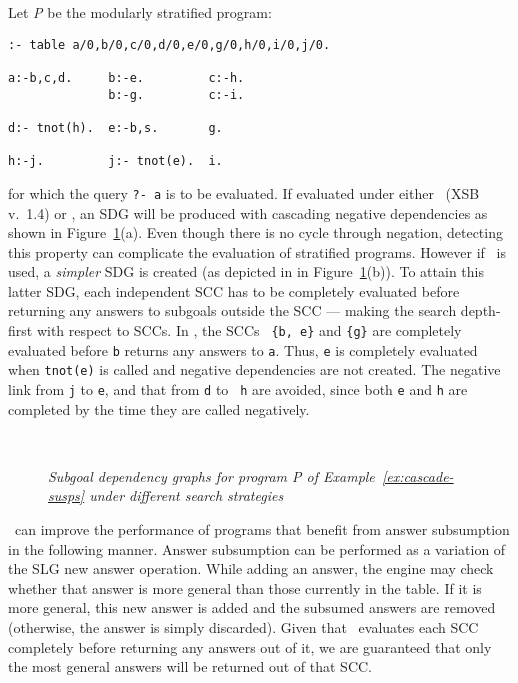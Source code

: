 \begin{example} \label{ex:cascade-susps} \rm
Let \emph{P} be the modularly stratified program:
\begin{verbatim}
:- table a/0,b/0,c/0,d/0,e/0,g/0,h/0,i/0,j/0.

a:-b,c,d.     b:-e.         c:-h. 
              b:-g.         c:-i.
 
d:- tnot(h).  e:-b,s.       g.            

h:-j.         j:- tnot(e).  i.                             
\end{verbatim}
\noindent
for which the query {\tt ?- a} is to be evaluated.  If evaluated under
either \oldsched\ (XSB v.~1.4) or \newsched, an SDG will be produced
with cascading negative dependencies as shown in
Figure~\ref{fig:lrd-pgm}(a).  Even though there is no cycle through
negation, detecting this property can complicate the evaluation of
stratified programs. However if \localsched\ is used, a \emph{simpler}
SDG is created (as depicted in in Figure~\ref{fig:lrd-pgm}(b)). To attain
this latter SDG, each independent SCC has to be completely evaluated
before returning any answers to subgoals outside the SCC --- making the
search depth-first with respect to SCCs.  In \localsched, the SCCs {\tt
\{b, e\}} and {\tt \{g\}} are completely evaluated before {\tt b}
returns any answers to {\tt a}. Thus, {\tt e} is completely evaluated
when {\tt tnot(e)} is called and negative dependencies are not created.
The negative link from {\tt j} to {\tt e}, and that from {\tt d} to {\tt
h} are avoided, since both {\tt e} and {\tt h} are completed by the time
they are called negatively.

\begin{figure}[htb]
\centering
\mbox{\quad
      \quad
     }
\caption{\emph{Subgoal dependency graphs for program \emph{P} of
Example~\ref{ex:cascade-susps} under different search strategies}}
\label{fig:lrd-pgm}
\end{figure}

\end{example}

\Localsched\ can improve the performance of programs that benefit
from answer subsumption in the following manner.  Answer subsumption can
be performed as a variation of the SLG {\sc new answer} operation. While
adding an answer, the engine may check whether that answer is more
general than those currently in the table.  If it is more general, this
new answer is added and the subsumed answers are removed (otherwise, the
answer is simply discarded).  Given that \localsched\ evaluates each SCC
completely before returning any answers out of it, we are guaranteed
that only the most general answers will be returned out of that SCC.

